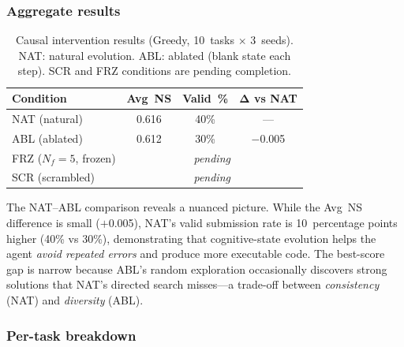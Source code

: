 \documentclass{article} %
\begin{document}
\subsubsection{Aggregate results}

\begin{table}[t]
\centering
\caption{Causal intervention results (Greedy, 10~tasks $\times$ 3~seeds).
NAT: natural evolution. ABL: ablated (blank state each step).
SCR and FRZ conditions are pending completion.}
\label{tab:causal}
\begin{tabular}{@{}lccc@{}}
\toprule
\textbf{Condition} & \textbf{Avg~NS} & \textbf{Valid~\%} &
$\boldsymbol{\Delta}$\textbf{ vs NAT} \\
\midrule
NAT (natural)            & 0.616 & 40\% & ---     \\
ABL (ablated)            & 0.612 & 30\% & $-$0.005 \\
FRZ ($N_f{=}5$, frozen)  & \multicolumn{3}{c}{\emph{pending}} \\
SCR (scrambled)           & \multicolumn{3}{c}{\emph{pending}} \\
\bottomrule
\end{tabular}
\end{table}

The NAT--ABL comparison reveals a nuanced picture. While the Avg~NS difference
is small ($+$0.005), NAT's valid submission rate is 10~percentage points higher
(40\% vs 30\%), demonstrating that cognitive-state evolution helps the agent
\emph{avoid repeated errors} and produce more executable code. The best-score
gap is narrow because ABL's random exploration occasionally discovers strong
solutions that NAT's directed search misses---a trade-off between
\emph{consistency} (NAT) and \emph{diversity} (ABL).

\subsubsection{Per-task breakdown}
\end{document}
